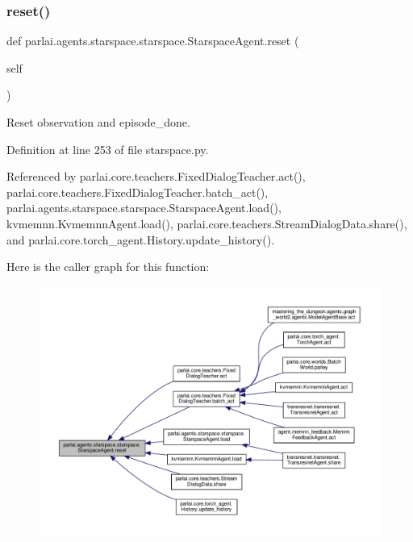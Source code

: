 \subsubsection{\texorpdfstring{reset()}{reset()}}
{\footnotesize\ttfamily def parlai.\+agents.\+starspace.\+starspace.\+Starspace\+Agent.\+reset (\begin{DoxyParamCaption}\item[{}]{self }\end{DoxyParamCaption})}

\begin{DoxyVerb}Reset observation and episode_done.\end{DoxyVerb}
 

Definition at line 253 of file starspace.\+py.



Referenced by parlai.\+core.\+teachers.\+Fixed\+Dialog\+Teacher.\+act(), parlai.\+core.\+teachers.\+Fixed\+Dialog\+Teacher.\+batch\+\_\+act(), parlai.\+agents.\+starspace.\+starspace.\+Starspace\+Agent.\+load(), kvmemnn.\+Kvmemnn\+Agent.\+load(), parlai.\+core.\+teachers.\+Stream\+Dialog\+Data.\+share(), and parlai.\+core.\+torch\+\_\+agent.\+History.\+update\+\_\+history().

Here is the caller graph for this function\+:
\nopagebreak
\begin{figure}[H]
\begin{center}
\leavevmode
\includegraphics[width=350pt]{classparlai_1_1agents_1_1starspace_1_1starspace_1_1StarspaceAgent_a4d5057250faeae3f3812603469daa282_icgraph}
\end{center}
\end{figure}
\mbox{\label{classparlai_1_1agents_1_1starspace_1_1starspace_1_1StarspaceAgent_a763de34b8d6464cbaa1ba17bf83f7df0}} 
